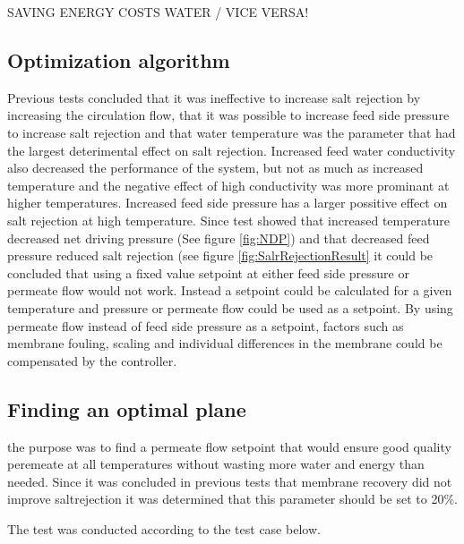 SAVING ENERGY COSTS WATER / VICE VERSA!


 
\newpage
\subsection{Optimization algorithm}

Previous tests concluded that it was ineffective to increase salt rejection by increasing the circulation flow, that it was possible to increase feed side pressure to increase salt rejection and that water temperature was the parameter that had the largest deterimental effect on salt rejection. Increased feed water conductivity also decreased the performance of the system, but not as much as increased temperature and the negative effect of high conductivity was more prominant at higher temperatures. Increased feed side pressure has a larger possitive effect on salt rejection at high temperature.
Since test showed that increased temperature decreased net driving pressure (See figure \ref{fig:NDP}) and that decreased feed pressure reduced salt rejection (see figure \ref{fig:SalrRejectionResult} it could be concluded that using a fixed value setpoint at either feed side pressure or permeate flow would not work. Instead a setpoint could be calculated for a given temperature and pressure or permeate flow could be used as a setpoint.
By using permeate flow instead of feed side pressure as a setpoint, factors such as membrane fouling, scaling and individual differences in the membrane could be compensated by the controller.

\subsection{Finding an optimal plane}

the purpose was to find a permeate flow setpoint that would ensure good quality peremeate at all temperatures without wasting more water and energy than needed. Since it was concluded in previous tests that membrane recovery did not improve saltrejection it was determined that this parameter should be set to 20\%. 

The test was conducted according to the test case below.  

